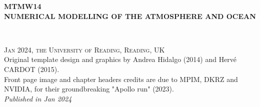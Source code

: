 \documentclass[11pt,fleqn]{book} %
\begin{document}
	
	\let\cleardoublepage\clearpage
	
	
	\begingroup
	\thispagestyle{empty}
	\centering
	\vspace*{0cm}
	\par\normalfont\fontsize{30}{25}\sffamily\selectfont
	\textbf{MTMW14\\NUMERICAL MODELLING OF THE ATMOSPHERE AND OCEAN}\\
	{\LARGE }\par %
	\vspace*{1cm}
	{\color{white}{\Huge P.L. Vidale \\ January 2024}}\par %
	\endgroup
	
	
	\newpage
	~\vfill
	\thispagestyle{empty}
	
	
	\noindent \textsc{Jan 2024, the University of Reading, Reading, UK}\\
	
	\noindent Original template design and graphics by Andrea Hidalgo (2014) and Hervé CARDOT (2015).\\ %
	
	\noindent Front page image and chapter headers credits are due to MPIM, DKRZ and NVIDIA, for their groundbreaking "Apollo run" (2023).\\ %
	
	\noindent \textit{Published in Jan 2024} %
	
	
	\pagestyle{empty} %
	
\end{document}

